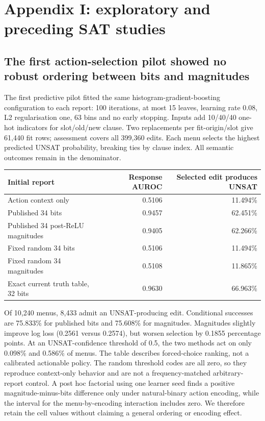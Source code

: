 \documentclass[
  british,
  11pt,
  a4paper,
]{article}
\newcounter{none} %
\begin{document}
\section{Appendix I: exploratory and preceding SAT
studies}\label{appendix-i-exploratory-and-preceding-sat-studies}

\subsection{The first action-selection pilot showed no robust ordering
between bits and
magnitudes}\label{the-first-action-selection-pilot-showed-no-robust-ordering-between-bits-and-magnitudes}

The first predictive pilot fitted the same histogram-gradient-boosting
configuration to each report: 100 iterations, at most 15 leaves,
learning rate 0.08, L2 regularisation one, 63 bins and no early
stopping. Inputs add 10/40/40 one-hot indicators for slot/old/new
clause. Two replacements per fit-origin/slot give 61,440 fit rows;
assessment covers all 399,360 edits. Each menu selects the highest
predicted UNSAT probability, breaking ties by clause index. All semantic
outcomes remain in the denominator.

{\def\LTcaptype{none} %
\begin{longtable}[]{@{}lrr@{}}
\toprule\noalign{}
Initial report & Response AUROC & Selected edit produces UNSAT \\
\midrule\noalign{}
\endhead
\bottomrule\noalign{}
\endlastfoot
Action context only & 0.5106 & 11.494\% \\
Published 34 bits & 0.9457 & 62.451\% \\
Published 34 post-ReLU magnitudes & 0.9405 & 62.266\% \\
Fixed random 34 bits & 0.5106 & 11.494\% \\
Fixed random 34 magnitudes & 0.5108 & 11.865\% \\
Exact current truth table, 32 bits & 0.9630 & 66.963\% \\
\end{longtable}
}

Of 10,240 menus, 8,433 admit an UNSAT-producing edit. Conditional
successes are 75.833\% for published bits and 75.608\% for magnitudes.
Magnitudes slightly improve log loss (0.2561 versus 0.2574), but worsen
selection by 0.1855 percentage points. At an UNSAT-confidence threshold
of 0.5, the two methods act on only 0.098\% and 0.586\% of menus. The
table describes forced-choice ranking, not a calibrated actionable
policy. The random threshold codes are all zero, so they reproduce
context-only behavior and are not a frequency-matched arbitrary-report
control. A post hoc factorial using one learner seed finds a positive
magnitude-minus-bits difference only under natural-binary action
encoding, while the interval for the menu-by-encoding interaction
includes zero. We therefore retain the cell values without claiming a
general ordering or encoding effect.
\end{document}
